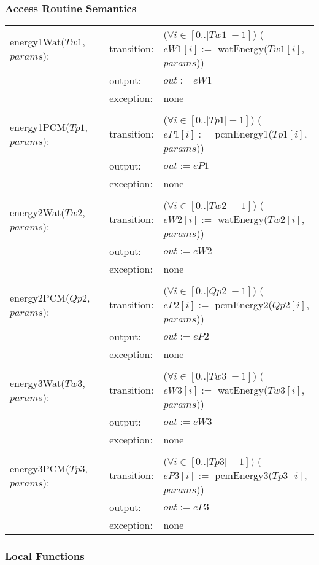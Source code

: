\documentclass[12pt]{article}
\begin{document}
\subsubsection{Access Routine Semantics}
\begin{center}
\begin{tabular}{l l p{6cm}}
energy1Wat($Tw1$, $params$): & transition: & ($\forall i \in [0..|Tw1| - 1]$) ($eW1[i] :=$ watEnergy($Tw1[i]$, $params$)) \\
& output: & $out := eW1$ \\ 
& exception: & none \\ \\
energy1PCM($Tp1$, $params$): & transition: & ($\forall i \in [0..|Tp1| - 1]$) ($eP1[i]:=$ pcmEnergy1($Tp1[i]$, $params$)) \\
& output: & $out := eP1$ \\ 
& exception: & none \\ \\
energy2Wat($Tw2$, $params$): & transition: & ($\forall i \in [0..|Tw2| - 1]$) ($eW2[i] :=$ watEnergy($Tw2[i]$, $params$)) \\
& output: & $out := eW2$ \\ 
& exception: & none \\ \\
energy2PCM($Qp2$, $params$): & transition: & ($\forall i \in [0..|Qp2| - 1]$) ($eP2[i] :=$ pcmEnergy2($Qp2[i]$, $params$)) \\
& output: & $out := eP2$ \\ 
& exception: & none \\ \\
energy3Wat($Tw3$, $params$): & transition: & ($\forall i \in [0..|Tw3| - 1]$) ($eW3[i] :=$ watEnergy($Tw3[i]$, $params$)) \\
& output: & $out := eW3$ \\ 
& exception: & none \\ \\
energy3PCM($Tp3$, $params$): & transition: & ($\forall i \in [0..|Tp3| - 1]$) ($eP3[i] :=$ pcmEnergy3($Tp3[i]$, $params$)) \\
& output: & $out := eP3$ \\
& exception: & none \\
\end{tabular}
\end{center}

\subsubsection{Local Functions}
\end{document}
